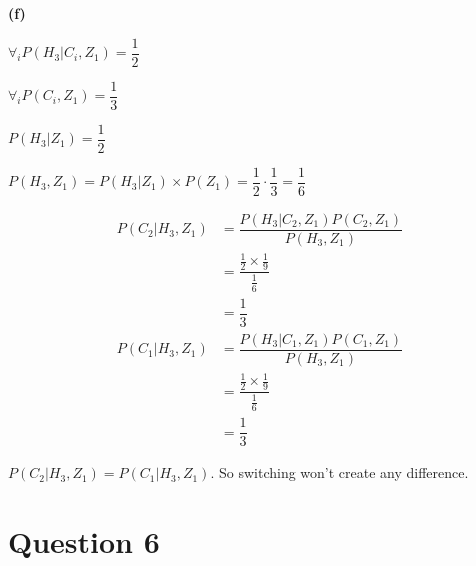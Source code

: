 \documentclass{article}
\theoremstyle{remark}
\begin{document}
\hspace{2.5em} \textbf{(f)}
\begin{center}
    $ \forall_i P(H_3|C_i,Z_1)=\dfrac{1}{2}$ \par
    $\forall_i P(C_i,Z_1)=\dfrac{1}{3}$ \par

    $P(H_3|Z_1)=\dfrac{1}{2}$ \par
    $P(H_3,Z_1)=P(H_3|Z_1) \times P(Z_1)=\dfrac{1}{2} \cdot \dfrac{1}{3}=\dfrac{1}{6} $ \par
    \begin{align*}
        P(C_2|H_3,Z_1) & = \dfrac{P(H_3|C_2,Z_1)P(C_2,Z_1)}{P(H_3,Z_1)} \\
                       & = \dfrac{\frac{1}{2} \times \frac{1}{9}}{\frac{1}{6}}    \\
                       & = \dfrac{1}{3}
    \end{align*}
    \begin{align*}
        P(C_1|H_3,Z_1) & = \dfrac{P(H_3|C_1,Z_1)P(C_1,Z_1)}{P(H_3,Z_1)}       \\
                       & =\dfrac{\frac{1}{2} \times \frac{1}{9}}{\frac{1}{6}} \\
                       & = \dfrac{1}{3}
    \end{align*}

    $P(C_2|H_3,Z_1) = P(C_1|H_3,Z_1)$. So switching won't create any difference.
    


\end{center}





\newpage

\section{Question 6}

\end{document}
